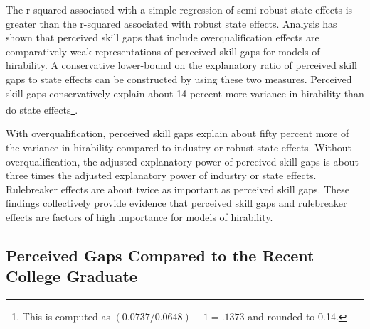 \documentclass[review]{elsarticle}
\begin{document}
The r-squared associated with a simple regression of semi-robust state effects is greater than the r-squared associated with robust state effects.
Analysis has shown that perceived skill gaps that include overqualification effects are comparatively weak representations of perceived skill gaps for models of hirability.
A conservative lower-bound on the explanatory ratio of perceived skill gaps to state effects can be constructed by using these two measures.
Perceived skill gaps conservatively explain about 14 percent more variance in hirability than do state effects\footnote{
    This is computed as $(0.0737 / 0.0648) - 1 = .1373$ and rounded to 0.14.
}.

With overqualification, perceived skill gaps explain about fifty percent more of the variance in hirability compared to industry or robust state effects.
Without overqualification, the adjusted explanatory power of perceived skill gaps is about three times the adjusted explanatory power of industry or state effects.
Rulebreaker effects are about twice as important as perceived skill gaps.
These findings collectively provide evidence that perceived skill gaps and rulebreaker effects are factors of high importance for models of hirability.

\subsection{Perceived Gaps Compared to the Recent College Graduate}
\end{document}
